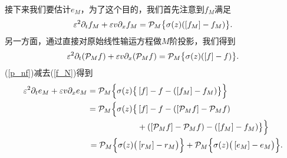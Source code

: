 接下来我们要估计$e_M$，为了这个目的，我们首先注意到$f_M$满足
\begin{equation}\label{f_N}
  \varepsilon^2 \partial_t f_M + \varepsilon v \partial_x f_M = \mathcal{P}_M\big\{\sigma(z)(\left[ f_M \right]-f_M)\big\}.
\end{equation}
另一方面，通过直接对原始线性输运方程做$M$阶投影，我们得到
\begin{equation}\label{p_nf}
  \varepsilon^2 \partial_t (\mathcal{P}_M f) + \varepsilon v \partial_x (\mathcal{P}_M f) = \mathcal{P}_M\big\{\sigma(z)(\left[ f \right]-f)\big\}.
\end{equation}
(\ref{p_nf})减去(\ref{f_N})得到
\begin{equation}\label{e_n}
  \begin{split}
    \varepsilon^2 \partial_t e_M + \varepsilon v \partial_x e_M
    = \mathcal{P}_M\Big\{\sigma(z)\big\{{} & \left[ f \right]-f - (\left[ f_M \right]-f_M)\big\}\Big\}
    \\
    = \mathcal{P}_M\Big\{\sigma(z)\big\{{} & \left[ f \right]-f - (\left[ \mathcal{P}_M f \right]-\mathcal{P}_M f)
    \\
    {} & + (\left[ \mathcal{P}_M f \right]-\mathcal{P}_M f) - (\left[ f_M \right]-f_M)\big\}\Big\}
    \\
    = \mathcal{P}_M\Big\{\sigma(z)\big({} & \left[ r_M \right]-r_M \big)\Big\} + \mathcal{P}_M\Big\{\sigma(z)\big(\left[ e_M \right]-e_M\big)\Big\}.
  \end{split}
\end{equation}

